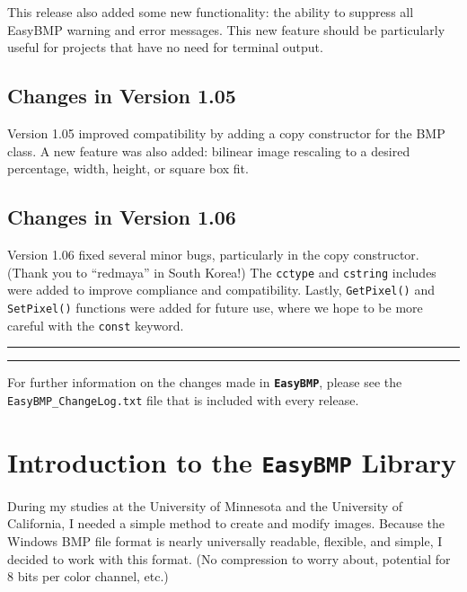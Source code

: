 \documentclass[12pt]{article}
\newcommand{\EasyBMP}{\textbf{\texttt{{\color{DarkBlue}Easy}{\color{DarkRed}BMP}}}}
\begin{document}
This release also added some new functionality: the ability 
to suppress all EasyBMP warning and error messages. This new 
feature should be particularly useful for projects that have 
no need for terminal output. 

\subsection{Changes in Version 1.05}
Version 1.05 improved compatibility by adding a copy constructor 
for the BMP class. A new feature was also added: bilinear image 
rescaling to a desired percentage, width, height, or square 
box fit. 

\subsection{Changes in Version 1.06}
Version 1.06 fixed several minor bugs, particularly in the 
copy constructor. (Thank you to ``redmaya'' in South Korea!) 
The \texttt{cctype} and \texttt{cstring} includes were added 
to improve compliance and compatibility. Lastly, 
\texttt{GetPixel()} and \texttt{SetPixel()} functions were 
added for future use, where we hope to be more careful with the 
\texttt{const} keyword. \\

\hrule\vskip 0.01in\hrule\vskip 0.25in

For further information on the changes made in \EasyBMP{}, 
please see the \texttt{EasyBMP\_ChangeLog.txt} file that is 
included with every release. 

\section{Introduction to the \EasyBMP{} Library}
During my studies at the University of Minnesota 
and the University of California, I needed a simple 
method to create and modify images. Because the Windows BMP file format 
is nearly universally readable, flexible, and simple, I decided to 
work with this format. (No compression to worry about, potential 
for 8 bits per color channel, etc.) \\
\end{document}
